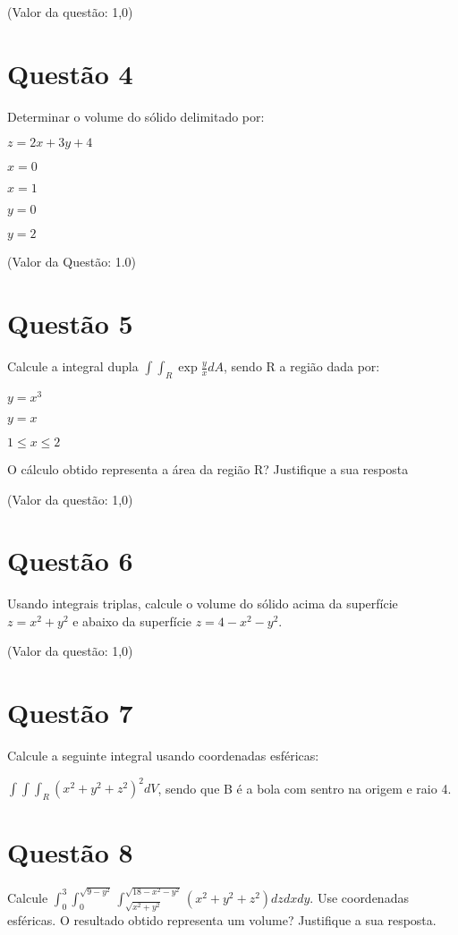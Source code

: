 \documentclass[10pt,a4paper]{article}
\begin{document}
	(Valor da questão: 1,0)
	
	\section*{Questão 4}
	
	Determinar o volume do sólido delimitado por:
	
	$ z = 2x+3y+4 $
	
	$ x = 0 $
	
	$ x = 1 $
	
	$ y = 0 $
	
	$ y = 2 $
	
	(Valor da Questão: 1.0)
	
	\section*{Questão 5}
	
	Calcule a integral dupla $ \int \int_R \exp{\frac{y}{x}} dA $, sendo R a região dada por:
	
	$ y = x^3 $
	
	$ y = x $
	
	$ 1 \le x \le 2 $
	
	O cálculo obtido representa a área da região R? Justifique a sua resposta
	
	(Valor da questão: 1,0)
	
	
	\section*{Questão 6}
	
	Usando integrais triplas, calcule o volume do sólido acima da superfície $ z = x^2 + y^2 $ e abaixo da superfície $ z = 4 - x^2 - y^2 $.
	
	(Valor da questão: 1,0)
	
	\section*{Questão 7}
	
	Calcule a seguinte integral usando coordenadas esféricas:
	
	$ \int \int \int_R (x^2 + y^2 + z^2)^2 dV $, sendo que B é a bola com sentro na origem e raio 4.
	
	\section*{Questão 8}
	
	Calcule $ \int_{0}^3 \int_{0}^{\sqrt{9-y^2}} \int_{\sqrt{x^2+y^2}}^{\sqrt{18-x^2-y^2}} (x^2 + y^2 + z^2) dz dx dy $. Use coordenadas esféricas. O resultado obtido representa um volume? Justifique a sua resposta.
	
\end{document}
